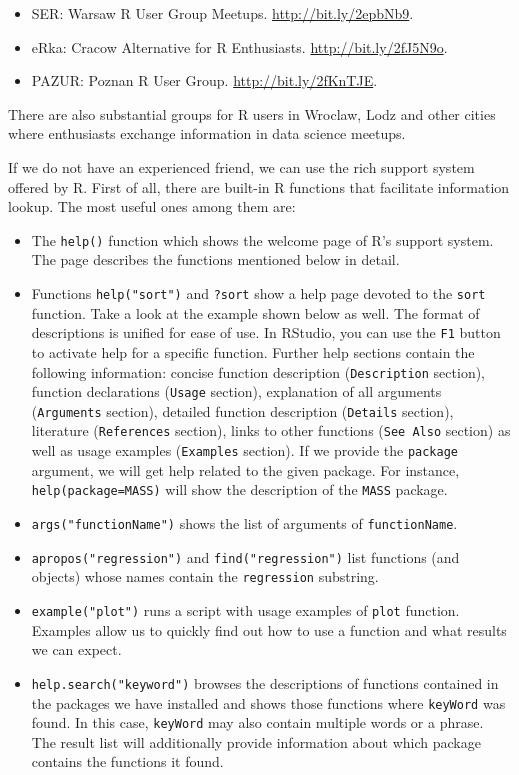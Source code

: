 \documentclass[]{book}
\theoremstyle{definition}
\theoremstyle{definition}
\theoremstyle{definition}
\theoremstyle{remark}
\begin{document}
\begin{itemize}
\item
  SER: Warsaw R User Group Meetups. \url{http://bit.ly/2epbNb9}.
\item
  eRka: Cracow Alternative for R Enthusiasts.
  \url{http://bit.ly/2fJ5N9o}.
\item
  PAZUR: Poznan R User Group. \url{http://bit.ly/2fKnTJE}.
\end{itemize}

There are also substantial groups for R users in Wroclaw, Lodz and other
cities where enthusiasts exchange information in data science meetups.

If we do not have an experienced friend, we can use the rich support
system offered by R. First of all, there are built-in R functions that
facilitate information lookup. The most useful ones among them are:

\begin{itemize}
\item
  The \texttt{help()} function which shows the welcome page of R's
  support system. The page describes the functions mentioned below in
  detail.
\item
  Functions \texttt{help("sort")} and \texttt{?sort} show a help page
  devoted to the \texttt{sort} function. Take a look at the example
  shown below as well. The format of descriptions is unified for ease of
  use. In RStudio, you can use the \texttt{F1} button to activate help
  for a specific function. Further help sections contain the following
  information: concise function description (\texttt{Description}
  section), function declarations (\texttt{Usage} section), explanation
  of all arguments (\texttt{Arguments} section), detailed function
  description (\texttt{Details} section), literature
  (\texttt{References} section), links to other functions
  (\texttt{See\ Also} section) as well as usage examples
  (\texttt{Examples} section). If we provide the \texttt{package}
  argument, we will get help related to the given package. For instance,
  \texttt{help(package=MASS)} will show the description of the
  \texttt{MASS} package.
\item
  \texttt{args("functionName")} shows the list of arguments of
  \texttt{functionName}.
\item
  \texttt{apropos("regression")} and \texttt{find("regression")} list
  functions (and objects) whose names contain the \texttt{regression}
  substring.
\item
  \texttt{example("plot")} runs a script with usage examples of
  \texttt{plot} function. Examples allow us to quickly find out how to
  use a function and what results we can expect.
\item
  \texttt{help.search("keyword")} browses the descriptions of functions
  contained in the packages we have installed and shows those functions
  where \texttt{keyWord} was found. In this case, \texttt{keyWord} may
  also contain multiple words or a phrase. The result list will
  additionally provide information about which package contains the
  functions it found.
\end{itemize}
\end{document}
